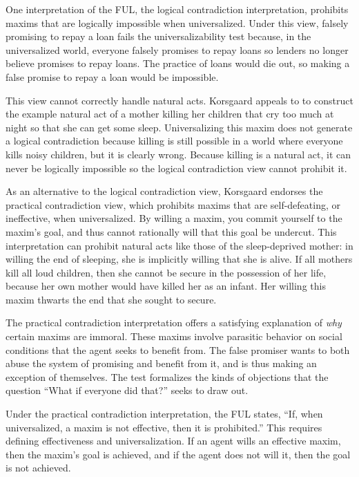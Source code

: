 \begin{isabellebody}
\begin{isamarkuptext}
One interpretation of the FUL, the logical contradiction interpretation, prohibits maxims that are 
logically impossible when universalized. Under this view, falsely promising to repay a loan fails the 
universalizability test because, in the universalized world, everyone falsely promises to repay
loans so lenders no longer believe promises to repay loans. The practice of loans would die out, so 
making a false promise to repay a loan would be impossible.

This view cannot correctly handle natural acts. Korsgaard appeals to 
\citet{dietrichson} to construct the example natural act of a mother killing her children that
cry too much at night so that she can get some sleep. Universalizing this maxim does not generate a logical 
contradiction because killing is still possible in a world where everyone kills noisy children, but 
it is clearly wrong. Because killing is a natural act, it can never be logically 
impossible so the logical contradiction view cannot prohibit it.

As an alternative to the logical contradiction view, Korsgaard endorses the practical contradiction view, 
which prohibits maxims that are self-defeating, or ineffective, when universalized. By willing a maxim, 
you commit yourself to the maxim's goal, and thus cannot rationally will that this goal be 
undercut. This interpretation can prohibit natural acts like those of the sleep-deprived mother: in 
willing the end of sleeping, she is implicitly willing that she is alive. If all mothers kill all 
loud children, then she cannot be secure in the possession of her life, because her own mother would 
have killed her as an infant. Her willing this maxim thwarts the end that she sought to secure. 

The practical contradiction interpretation offers a satisfying explanation of \emph{why} certain 
maxims are immoral. These maxims involve parasitic behavior on social conditions that the agent seeks 
to benefit from. The false promiser wants to both abuse the system of promising and benefit 
from it, and is thus making an exception of themselves. The test formalizes the kinds of objections 
that the question ``What if everyone did that?'' seeks to draw out.

Under the practical contradiction interpretation, the FUL states, ``If, when universalized, a maxim is 
not effective, then it is prohibited.'' This requires defining effectiveness and universalization. 
If an agent wills an effective maxim, then the maxim's goal is achieved, and if the agent does 
not will it, then the goal is not achieved. 


\end{isamarkuptext}
\end{isabellebody}

